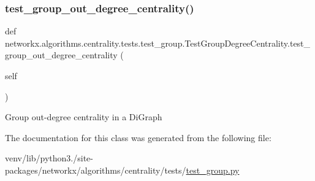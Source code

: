 \subsubsection{\texorpdfstring{test\+\_\+group\+\_\+out\+\_\+degree\+\_\+centrality()}{test\_group\_out\_degree\_centrality()}}
{\footnotesize\ttfamily def networkx.\+algorithms.\+centrality.\+tests.\+test\+\_\+group.\+Test\+Group\+Degree\+Centrality.\+test\+\_\+group\+\_\+out\+\_\+degree\+\_\+centrality (\begin{DoxyParamCaption}\item[{}]{self }\end{DoxyParamCaption})}

\begin{DoxyVerb}Group out-degree centrality in a DiGraph
\end{DoxyVerb}
 

The documentation for this class was generated from the following file\+:\begin{DoxyCompactItemize}
\item 
venv/lib/python3./site-\/packages/networkx/algorithms/centrality/tests/\hyperlink{test__group_8py}{test\+\_\+group.\+py}\end{DoxyCompactItemize}
